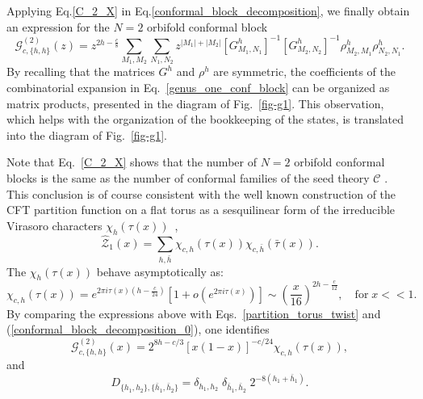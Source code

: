 \documentclass[a4paper,11pt]{article}
\begin{document}
Applying Eq.\eqref{C_2_X} in Eq.\eqref{conformal_block_decomposition}, we finally obtain an 
expression for the $N=2$ orbifold conformal block
\begin{equation}\label{genus_one_conf_block}
 \mathcal{G}_{c, \{h,h\}}^{(2)}(z)=z^{2h-\frac{c}{8}}\sum_{M_1, M_2}\sum_{N_1, N_2}
 z^{|M_1|+|M_2|}[G^{h}_{M_1,N_1}]^{-1}[G^{h}_{ M_2,N_2}]^{-1}
 \rho^h_{M_2,M_1}\rho^h_{N_2,N_1}.
\end{equation}
By recalling that the matrices $G^h$ and $\rho^h$ are symmetric, the coefficients of the combinatorial 
expansion in Eq.~\eqref{genus_one_conf_block} can be organized as matrix products, presented in the diagram 
of Fig.~\ref{fig-g1}. This observation, which helps with the organization of the bookkeeping of the states, 
is translated into the diagram of Fig.~\ref{fig-g1}.

Note that Eq.~\eqref{C_2_X} shows that the number of $N=2$ orbifold conformal blocks is the same as the number
of conformal families of the seed theory $\mathcal{C}$ . This conclusion is of course consistent with
the well known construction of the CFT partition function on a flat torus as a sesquilinear form of the
irreducible Virasoro characters $\chi_{h}(\tau(x))$~\cite{Cappelli, Cappelli2},
\begin{equation}
\mathcal{\hat{Z}}_1(x) = \sum_{h,\bar{h}} \chi_{c,h}(\tau(x)) \chi_{c,\bar{h}}(\bar{\tau}(x)).
\end{equation}
The $\chi_{h}(\tau(x))$ behave asymptotically as:
\begin{equation}
\chi_{c, h}(\tau(x)) = e^{2\pi i \tau(x)\left(h-\frac{c}{24}\right)}\left[1+ o\left(e^{2\pi i \tau(x)}\right)\right] \sim \left(\frac{x}{16}\right)^{ 2 h-\frac{c}{12}}, \quad \text{for}\; x<<1.
\end{equation}
 By comparing the expressions above with Eqs.~\eqref{partition_torus_twist} and (\ref{conformal_block_decomposition_0}), one identifies 
\begin{equation}\label{character_conf_block}
\mathcal{G}_{c,\{h, h\}}^{(2)}(x)=2^{8h-c/3}[x(1-x)]^{-c/24}\chi_{c, h}(\tau(x)),
\end{equation}
and 
\begin{equation}\label{D_2}
 D_{\{ h_1, h_2 \}, \{ \bar{h}_1,\bar{h}_2\} } =\delta_{h_1,h_2}\;\delta_{\bar{h}_1,\bar{h}_2} \;2^{-8 (h_1+\bar{h}_1)}.
\end{equation}
\end{document}
